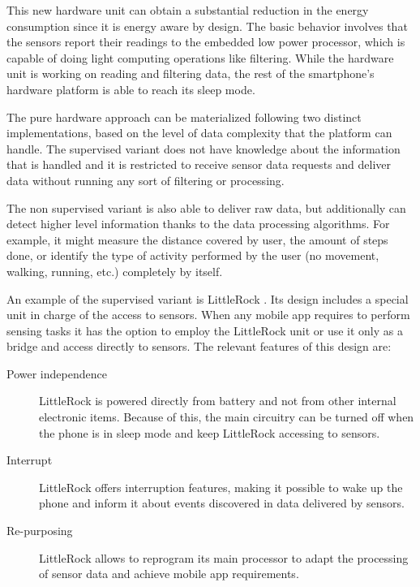 This new hardware unit can obtain a substantial reduction in the energy consumption since it is energy aware by design.
The basic behavior involves that the sensors report their readings to the embedded low power processor, which is capable of doing light computing operations like filtering.
While the hardware unit is working on reading and filtering data, the rest of the smartphone's hardware platform is able to reach its sleep mode.

The pure hardware approach can be materialized following two distinct implementations, based on the level of data complexity that the platform can handle.
The supervised variant does not have knowledge about the information that is handled and it is restricted to receive sensor data requests and deliver data without running any sort of filtering or processing.

The non supervised variant is also able to deliver raw data, but additionally can detect higher level information thanks to the data processing algorithms.
For example, it might measure the distance covered by user, the amount of steps done, or identify the type of activity performed by the user (no movement, walking, running, etc.) completely by itself.


An example of the supervised variant is LittleRock \cite{Priyantha2011}.
Its design includes a special unit in charge of the access to sensors.
When any mobile app requires to perform sensing tasks it has the option to employ the LittleRock unit or use it only as a bridge and access directly to sensors.
The relevant features of this design are:

\begin{description}
  \item[Power independence] LittleRock is powered directly from battery and not from other internal electronic items.
  Because of this, the main circuitry can be turned off when the phone is in sleep mode and keep LittleRock accessing to sensors.
  
  \item[Interrupt] LittleRock offers interruption features, making it possible to wake up the phone and inform it about events discovered in data delivered by sensors.
  
  \item[Re-purposing] LittleRock allows to reprogram its main processor to adapt the processing of sensor data and achieve mobile app requirements.
\end{description}

